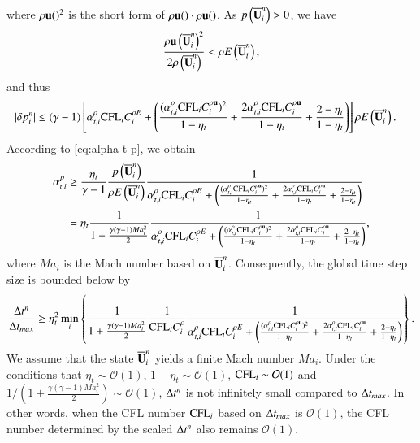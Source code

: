 where $\rho\mathbf{u}()^2$ is the short form of $\rho\mathbf{u}()\cdot\rho\mathbf{u}()$.
As $p\left(\overline{\mathbf{U}}^n_i\right) > 0$, we have
\begin{equation}
    \frac{ \rho\mathbf{u}\left(\overline{\mathbf{U}}^n_i\right)^2}{2\rho\left(\overline{\mathbf{U}}^n_i\right)} < \rho E\left(\overline{\mathbf{U}}^n_i\right),
\end{equation}
and thus
\begin{equation}
    \begin{aligned}
        |\delta p_i^n| &\leq
        (\gamma-1)\left[
         \alpha_{t,i}^\rho\text{CFL}_i C^{\rho E}_i  
        +\left(
        \frac{(\alpha_{t,i}^\rho\text{CFL}_i C^{\rho \mathbf{u}}_i)^2}{1-\eta_t}
        +\frac{2\alpha_{t,i}^\rho\text{CFL}_i C^{\rho \mathbf{u}}_i}{1-\eta_t}
        + \frac{2-\eta_t}{1-\eta_t}
        \right)
        \right]
        \rho E\left( \overline{\mathbf{U}}^n_i \right).
    \end{aligned}
\end{equation}
According to \eqref{eq:alpha-t-p}, we obtain
\begin{equation}
    \begin{aligned}
        \label{eq:alpha-t-p-lb}
        \alpha_{t,i}^{p} 
        & \geq \dfrac{\eta_t}{\gamma-1} \frac{p\left(\overline{\mathbf{U}}^n_i\right)}{
            \rho E\left(\overline{\mathbf{U}}^n_i\right)
        }
        \frac{1}{
         \alpha_{t,i}^\rho\text{CFL}_i C^{\rho E}_i  
            +\left(
            \frac{(\alpha_{t,i}^\rho\text{CFL}_i C^{\rho \mathbf{u}}_i)^2}{1-\eta_t}
            +\frac{2\alpha_{t,i}^\rho\text{CFL}_i C^{\rho \mathbf{u}}_i}{1-\eta_t}
            + \frac{2-\eta_t}{1-\eta_t}
            \right)
        } \\
        & = \eta_t \frac{1}{
           1 + \frac{\gamma (\gamma-1) Ma_i^2}{2}
        }
        \frac{1}{
         \alpha_{t,i}^\rho\text{CFL}_i C^{\rho E}_i  
            +\left(
            \frac{(\alpha_{t,i}^\rho\text{CFL}_i C^{\rho \mathbf{u}}_i)^2}{1-\eta_t}
            +\frac{2\alpha_{t,i}^\rho\text{CFL}_i C^{\rho \mathbf{u}}_i}{1-\eta_t}
            + \frac{2-\eta_t}{1-\eta_t}
            \right)
        },
    \end{aligned}
\end{equation}
where $Ma_i$ is the Mach number based on $\overline{\mathbf{U}}^n_i$. 
Consequently, the global time step size is bounded below by
\begin{equation}
    \label{eq:delta-t-lb}
    \frac{\mathrm\Delta t^n}{\mathrm\Delta t_{max}} \geq 
    \eta_t^2
    \min_i
    \left\{
    \frac{1}{
           1 + \frac{\gamma (\gamma-1) Ma_i^2}{2}
        }
    \frac{1}{\text{CFL}_i C_i^\rho}
    \frac{1}{
     \alpha_{t,i}^\rho\text{CFL}_i C^{\rho E}_i  
        +\left(
        \frac{(\alpha_{t,i}^\rho\text{CFL}_i C^{\rho \mathbf{u}}_i)^2}{1-\eta_t}
        +\frac{2\alpha_{t,i}^\rho\text{CFL}_i C^{\rho \mathbf{u}}_i}{1-\eta_t}
        + \frac{2-\eta_t}{1-\eta_t}
        \right)
    }
    \right\}.
\end{equation}
We assume that the state $\overline{\mathbf{U}}^n_i$ yields a finite Mach number $Ma_i$.
Under the conditions that $\eta_t\sim\mathcal{O}(1)$, $1-\eta_t\sim\mathcal{O}(1)$,
$\text{CFL}_i\sim\mathcal{O}(1)$ and ${1}/\left(1 + \frac{\gamma (\gamma-1) Ma_i^2}{2}\right)\sim\mathcal{O}(1)$,
$\mathrm\Delta t^n$ is not infinitely small compared to $\mathrm\Delta t_{max}$.
In other words, when the CFL number $\text{CFL}_i$ based on $\mathrm\Delta t_{max}$ is $\mathcal{O}(1)$, 
the CFL number determined by the scaled $\mathrm\Delta t^n$ also remains $\mathcal{O}(1)$.

